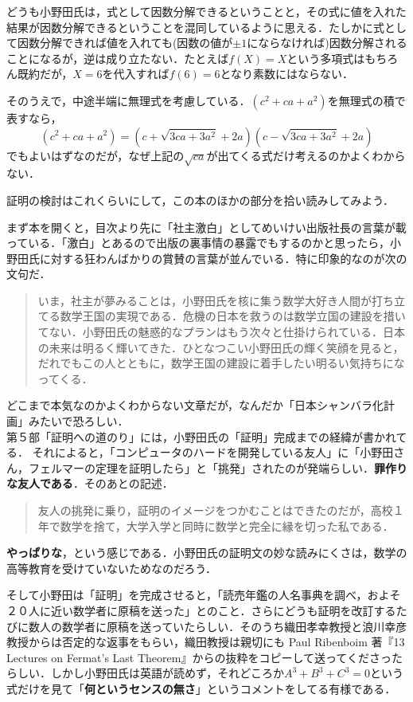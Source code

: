 どうも小野田氏は，式として因数分解できるということと，その式に値を入れた結果が因数分解できるということを混同しているように思える．たしかに式として因数分解できれば値を入れても(因数の値が$\pm 1$にならなければ)因数分解されることになるが，逆は成り立たない．たとえば$f(X)=X$という多項式はもちろん既約だが，$X=6$を代入すれば$f(6)=6$となり素数にはならない．

そのうえで，中途半端に無理式を考慮している．$(c^2+ca+a^2)$を無理式の積で表すなら，
\[(c^2+ca+a^2)=(c+\sqrt{3ca+3a^2}+2a)(c-\sqrt{3ca+3a^2}+2a)\]
でもよいはずなのだが，なぜ上記の$\sqrt{ca}$が出てくる式だけ考えるのかよくわからない．


証明の検討はこれくらいにして，この本のほかの部分を拾い読みしてみよう．

まず本を開くと，目次より先に「社主激白」としてめいけい出版社長の言葉が載っている．「激白」とあるので出版の裏事情の暴露でもするのかと思ったら，小野田氏に対する狂わんばかりの賞賛の言葉が並んでいる．特に印象的なのが次の文句だ．

\begin{quote}
いま，社主が夢みることは，小野田氏を核に集う数学大好き人間が打ち立てる数学王国の実現である．危機の日本を救うのは数学立国の建設を措いてない．小野田氏の魅惑的なプランはもう次々と仕掛けられている．日本の未来は明るく輝いてきた．ひとなつこい小野田氏の輝く笑顔を見ると，だれでもこの人とともに，数学王国の建設に着手したい明るい気持ちになってくる．
\end{quote}

どこまで本気なのかよくわからない文章だが，なんだか「日本シャンバラ化計画」みたいで恐ろしい．\\

第５部「証明への道のり」には，小野田氏の「証明」完成までの経緯が書かれてる．
それによると，「コンピュータのハードを開発している友人」に「小野田さん，フェルマーの定理を証明したら」と「挑発」されたのが発端らしい．\textbf{罪作りな友人である}．そのあとの記述．

\begin{quote}
友人の挑発に乗り，証明のイメージをつかむことはできたのだが，高校１年で数学を捨て，大学入学と同時に数学と完全に縁を切った私である．
\end{quote}

\textbf{やっぱりな}，という感じである．小野田氏の証明文の妙な読みにくさは，数学の高等教育を受けていないためなのだろう．

そして小野田は「証明」を完成させると，「読売年鑑の人名事典を調べ，およそ２０人に近い数学者に原稿を送った」とのこと．さらにどうも証明を改訂するたびに数人の数学者に原稿を送っていたらしい．そのうち織田孝幸教授と浪川幸彦教授からは否定的な返事をもらい，織田教授は親切にも Paul Ribenboim 著『13 Lectures on Fermat's Last Theorem』からの抜粋をコピーして送ってくださったらしい．しかし小野田氏は英語が読めず，それどころか$A^3+B^3+C^3=0$という式だけを見て「\textbf{何というセンスの無さ}」というコメントをしてる有様である．


